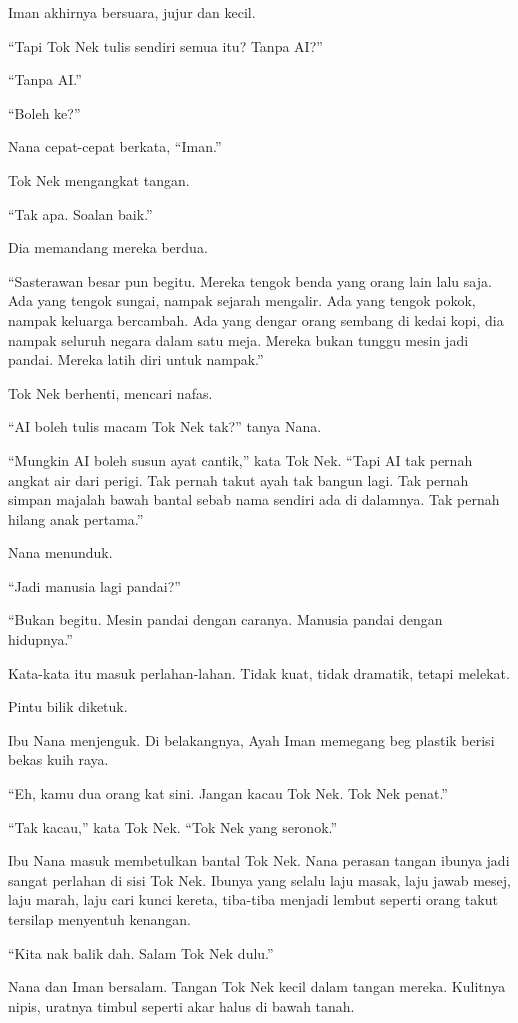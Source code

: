 \documentclass[
  11pt,
  a5paper,
  openany,
  oneside]{book}
\begin{document}
Iman akhirnya bersuara, jujur dan kecil.

``Tapi Tok Nek tulis sendiri semua itu? Tanpa AI?''

``Tanpa AI.''

``Boleh ke?''

Nana cepat-cepat berkata, ``Iman.''

Tok Nek mengangkat tangan.

``Tak apa. Soalan baik.''

Dia memandang mereka berdua.

``Sasterawan besar pun begitu. Mereka tengok benda yang orang lain lalu
saja. Ada yang tengok sungai, nampak sejarah mengalir. Ada yang tengok
pokok, nampak keluarga bercambah. Ada yang dengar orang sembang di kedai
kopi, dia nampak seluruh negara dalam satu meja. Mereka bukan tunggu
mesin jadi pandai. Mereka latih diri untuk nampak.''

Tok Nek berhenti, mencari nafas.

``AI boleh tulis macam Tok Nek tak?'' tanya Nana.

``Mungkin AI boleh susun ayat cantik,'' kata Tok Nek. ``Tapi AI tak
pernah angkat air dari perigi. Tak pernah takut ayah tak bangun lagi.
Tak pernah simpan majalah bawah bantal sebab nama sendiri ada di
dalamnya. Tak pernah hilang anak pertama.''

Nana menunduk.

``Jadi manusia lagi pandai?''

``Bukan begitu. Mesin pandai dengan caranya. Manusia pandai dengan
hidupnya.''

Kata-kata itu masuk perlahan-lahan. Tidak kuat, tidak dramatik, tetapi
melekat.

Pintu bilik diketuk.

Ibu Nana menjenguk. Di belakangnya, Ayah Iman memegang beg plastik
berisi bekas kuih raya.

``Eh, kamu dua orang kat sini. Jangan kacau Tok Nek. Tok Nek penat.''

``Tak kacau,'' kata Tok Nek. ``Tok Nek yang seronok.''

Ibu Nana masuk membetulkan bantal Tok Nek. Nana perasan tangan ibunya
jadi sangat perlahan di sisi Tok Nek. Ibunya yang selalu laju masak,
laju jawab mesej, laju marah, laju cari kunci kereta, tiba-tiba menjadi
lembut seperti orang takut tersilap menyentuh kenangan.

``Kita nak balik dah. Salam Tok Nek dulu.''

Nana dan Iman bersalam. Tangan Tok Nek kecil dalam tangan mereka.
Kulitnya nipis, uratnya timbul seperti akar halus di bawah tanah.
\end{document}
